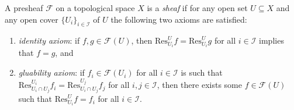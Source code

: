\documentclass[11pt]{book}
\begin{document}
\begin{definition}A presheaf $\mathscr{F}$ on a topological space $X$ is a \textit{sheaf} if for any open set $U\subseteq X$ and any open cover $\{U_i\}_{i\in\mathcal{I}}$ of $U$ the following two axioms are satisfied:
\begin{enumerate}[label=(\roman*)]
	\item \textit{identity axiom}: if $f,g\in\mathscr{F}(U)$, then $\mathrm{Res}^U_{U_i}f=\mathrm{Res}^U_{U_i}g$ for all $i\in\mathcal{I}$ implies that $f=g$, and
	\item \textit{gluability axiom}: if $f_i\in \mathscr{F}(U_i)$ for all $i\in\mathcal{I}$ is such that $\mathrm{Res}^{U_i}_{U_i\cap U_j}f_i=\mathrm{Res}^{U_j}_{U_i\cap U_j}f_j$ for all $i,j\in\mathcal{I}$, then there exists some $f\in\mathscr{F}(U)$ such that $\mathrm{Res}^U_{U_i}f=f_i$ for all $i\in\mathcal{I}$.
\end{enumerate}
\end{definition}
\end{document}
